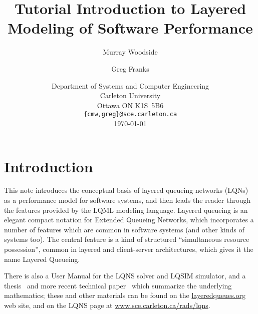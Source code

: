 \documentclass[11pt]{article}
\begin{document}
\title{Tutorial Introduction to Layered Modeling of Software Performance}

\author{Murray Woodside \and Greg Franks}
\date{Department of Systems and Computer Engineering\\
  Carleton University\\
  Ottawa ON K1S~5B6\\
  \texttt{\{cmw,greg\}@sce.carleton.ca}\\[1cm]
  \today}
\maketitle
\clearpage
\tableofcontents
\clearpage

\section{Introduction}

This note introduces the conceptual basis of layered queueing networks (LQNs) as a
performance model for software systems, and then leads the reader through the features provided by
the LQML modeling language. Layered queueing is an elegant compact notation for Extended
Queueing Networks, which incorporates a number of features which are common in software
systems (and other kinds of systems too). The central feature is a kind of structured ``simultaneous
resource possession'', common in layered and client-server architectures, which gives it the name
Layered Queueing.

There is also a User Manual for the LQNS solver and LQSIM simulator, and a thesis~\cite{THESIS:franks-99} and
more recent technical paper~\cite{IEEESE:franks-2009-ieeese-lqn} which summarize the underlying mathematics; these and other
materials can be found on the \href{http://layeredqueues.org}{layeredqueues.org} web site, and on the LQNS page at
\url{www.sce.carleton.ca/rads/lqns}.
\end{document}
